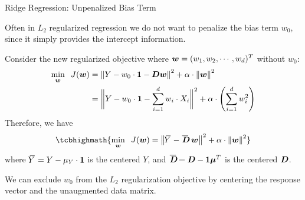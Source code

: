 \begin{frame}{Ridge Regression: Unpenalized Bias Term}

    Often in $L_2$ regularized regression we do not want to penalize the
    bias term $w_0$, since it simply provides the intercept
    information.

    \medskip

    Consider the new regularized
    objective where ${\boldsymbol w} = (w_1, w_2, \cdots, w_d)^T$ without $w_0$:
\begin{align*}
    \min_{\boldsymbol w}\;\; J({\boldsymbol w}) & = 
    \left\lVert Y - w_0 \cdot \mathbf{1} - {\boldsymbol D}{\boldsymbol w}\right\rVert^2 + \alpha \cdot
    \left\lVert{\boldsymbol w}\right\rVert^2\\
    & = \biggl\lVert Y - w_0 \cdot \mathbf{1} - \sum_{i=1}^d w_i \cdot
        X_i \biggr\rVert^2 +
    \alpha \cdot \left( \sum^{d}_{i=1} w_i^2 \right) \notag
\end{align*}
%    
%
Therefore, we have
\begin{align*}
    \tcbhighmath{
     \min_\bw\;\; J(\bw) = \norm{\mY - \mbD\;\bw}^2 + \alpha \cdot
 \norm{\bw}^2}
\end{align*}
    where $\mkern 1.5mu\overline{\mkern-4.0muY}\mkern 1.5mu = Y - \mu_Y \cdot \mathbf{1}$ 
    is the centered $Y$, and $\mbD = \bD - \bone \bmu^T$ is the
    centered ${\boldsymbol D}$.

	\medskip

 We can exclude $w_0$ from the $L_2$ regularization
    objective by centering the response vector and the
    unaugmented data matrix. 
\end{frame}

